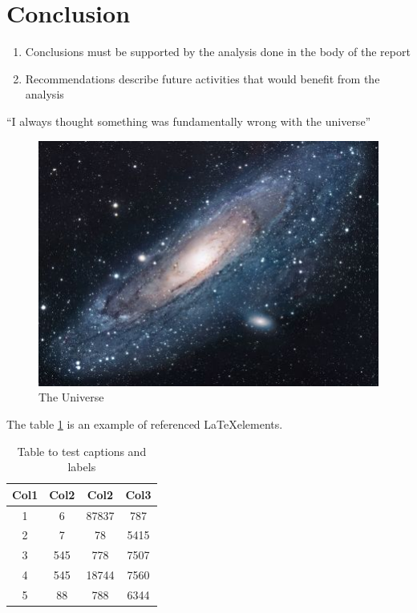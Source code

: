 \section{Conclusion}

\begin{enumerate}
    \item Conclusions must be supported by the analysis done in the body of the report
    \item Recommendations describe future activities that would benefit from the analysis
\end{enumerate}

``I always thought something was fundamentally wrong with the universe'' \cite{adams1995hitchhiker}

\begin{figure}[h!]
\centering
\includegraphics[scale=1.7]{../images/universe.jpg}
\caption{The Universe}
\label{fig:universe}
\end{figure}

The table \ref{table:1} is an example of referenced \LaTeX elements.
 
\begin{table}[h!]
\centering
\begin{tabular}{||c c c c||} 
 \hline
 Col1 & Col2 & Col2 & Col3 \\ [0.5ex] 
 \hline\hline
 1 & 6 & 87837 & 787 \\ 
 2 & 7 & 78 & 5415 \\
 3 & 545 & 778 & 7507 \\
 4 & 545 & 18744 & 7560 \\
 5 & 88 & 788 & 6344 \\ [1ex] 
 \hline
\end{tabular}
\caption{Table to test captions and labels}
\label{table:1}
\end{table}